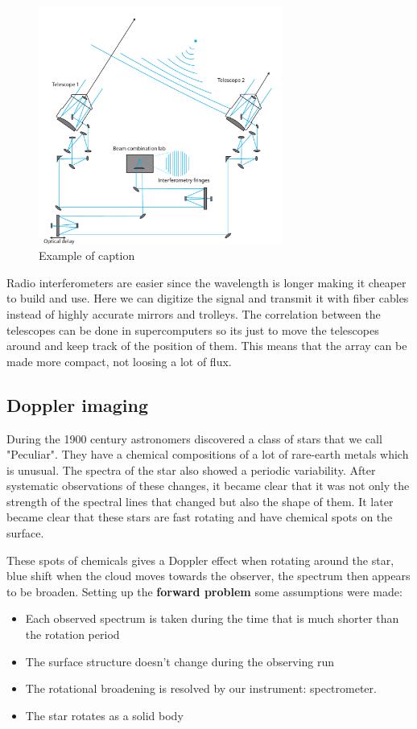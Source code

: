 		\begin{figure}[ht!]
		 \centering
		 \includegraphics[width=80mm]{figures/telescopes.pdf}
		 \caption{Example of caption}
		 \label{fig:example}
		 \end{figure}
	  
	 Radio interferometers are easier since the wavelength is longer making it cheaper to build and use. Here we can digitize the signal and transmit it with fiber cables instead of highly accurate mirrors and trolleys. The correlation between the telescopes can be done in supercomputers so its just to move the telescopes around and keep track of the position of them. This means that the array can be made more compact, not loosing a lot of flux. 

	 \subsection*{Doppler imaging}
	 During the 1900 century astronomers discovered a class of stars that we call "Peculiar". They have a chemical compositions of a lot of rare-earth metals which is unusual. The spectra of the star also showed a periodic variability. After systematic observations of these changes, it became clear that it was not only the strength of the spectral lines that changed but also the shape of them. It later became clear that these stars are fast rotating and have chemical spots on the surface. 

	 These spots of chemicals gives a Doppler effect when rotating around the star, blue shift when the cloud moves towards the observer, the spectrum then appears to be broaden. Setting up the \textbf{forward problem} some assumptions were made: 

		\begin{itemize}
			\item Each observed spectrum is taken during the time that is much shorter than the rotation period
		   	\item The surface structure doesn't change during the observing run
		   	\item The rotational broadening is resolved by our instrument: spectrometer. 
		   	\item The star rotates as a solid body
		\end{itemize}  

